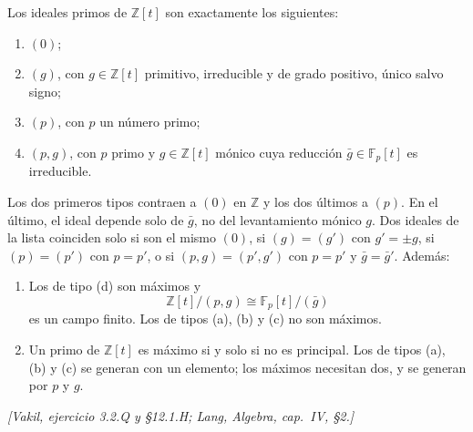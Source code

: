 \begin{prop}
\label{prop:s08-primos-z-t}
Los ideales primos de $\mathbb Z[t]$ son exactamente los siguientes:
\begin{enumerate}[label=(\alph*)]
\item $(0)$;
\item $(g)$, con $g\in\mathbb Z[t]$ primitivo, irreducible y de grado positivo, único salvo signo;
\item $(p)$, con $p$ un número primo;
\item $(p,g)$, con $p$ primo y $g\in\mathbb Z[t]$ mónico cuya reducción $\bar g\in\mathbb F_p[t]$ es irreducible.
\end{enumerate}
Los dos primeros tipos contraen a $(0)$ en $\mathbb Z$ y los dos últimos a $(p)$. En el último, el ideal depende solo de $\bar g$, no del levantamiento mónico $g$. Dos ideales de la lista coinciden solo si son el mismo $(0)$, si $(g)=(g')$ con $g'=\pm g$, si $(p)=(p')$ con $p=p'$, o si $(p,g)=(p',g')$ con $p=p'$ y $\bar g=\bar g'$. Además:
\begin{enumerate}[label=(\alph*),start=5]
\item Los de tipo (d) son máximos y
\[
\mathbb Z[t]/(p,g)\cong\mathbb F_p[t]/(\bar g)
\]
es un campo finito. Los de tipos (a), (b) y (c) no son máximos.
\item Un primo de $\mathbb Z[t]$ es máximo si y solo si no es principal. Los de tipos (a), (b) y (c) se generan con un elemento; los máximos necesitan dos, y se generan por $p$ y $g$.
\end{enumerate}
\emph{[Vakil, ejercicio 3.2.Q y \S12.1.H; Lang, Algebra, cap.~IV, \S2.]}
\end{prop}
